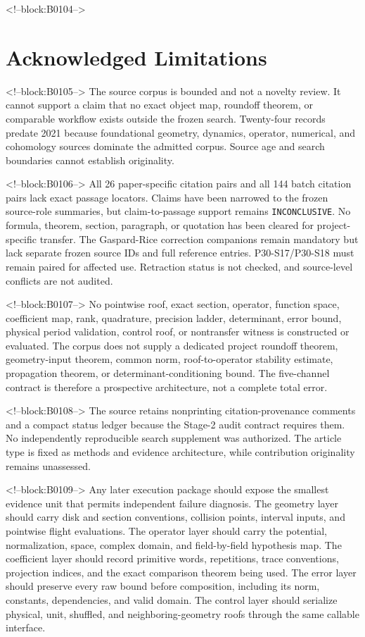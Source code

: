 \documentclass[11pt,a4paper]{article}
\begin{document}
<!--block:B0104-->
\section{Acknowledged Limitations}

<!--block:B0105-->
The source corpus is bounded and not a novelty review. It cannot support a claim that no exact object map, roundoff theorem, or comparable workflow exists outside the frozen search. Twenty-four records predate 2021 because foundational geometry, dynamics, operator, numerical, and cohomology sources dominate the admitted corpus. Source age and search boundaries cannot establish originality.

<!--block:B0106-->
All 26 paper-specific citation pairs and all 144 batch citation pairs lack exact passage locators. Claims have been narrowed to the frozen source-role summaries, but claim-to-passage support remains \texttt{INCONCLUSIVE}. No formula, theorem, section, paragraph, or quotation has been cleared for project-specific transfer. The Gaspard-Rice correction companions remain mandatory but lack separate frozen source IDs and full reference entries. P30-S17/P30-S18 must remain paired for affected use. Retraction status is not checked, and source-level conflicts are not audited.

<!--block:B0107-->
No pointwise roof, exact section, operator, function space, coefficient map, rank, quadrature, precision ladder, determinant, error bound, physical period validation, control roof, or nontransfer witness is constructed or evaluated. The corpus does not supply a dedicated project roundoff theorem, geometry-input theorem, common norm, roof-to-operator stability estimate, propagation theorem, or determinant-conditioning bound. The five-channel contract is therefore a prospective architecture, not a complete total error.

<!--block:B0108-->
The source retains nonprinting citation-provenance comments and a compact status ledger because the Stage-2 audit contract requires them. No independently reproducible search supplement was authorized. The article type is fixed as methods and evidence architecture, while contribution originality remains unassessed.

<!--block:B0109-->
Any later execution package should expose the smallest evidence unit that permits independent failure diagnosis. The geometry layer should carry disk and section conventions, collision points, interval inputs, and pointwise flight evaluations. The operator layer should carry the potential, normalization, space, complex domain, and field-by-field hypothesis map. The coefficient layer should record primitive words, repetitions, trace conventions, projection indices, and the exact comparison theorem being used. The error layer should preserve every raw bound before composition, including its norm, constants, dependencies, and valid domain. The control layer should serialize physical, unit, shuffled, and neighboring-geometry roofs through the same callable interface.
\end{document}
